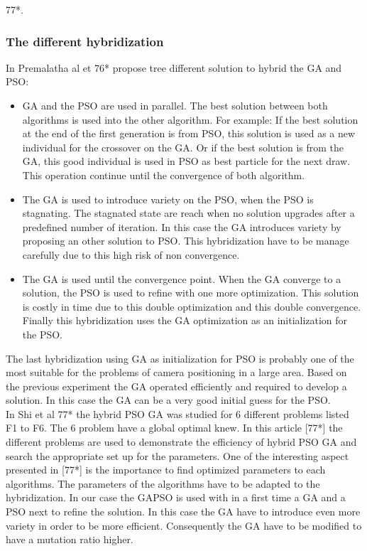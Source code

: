   77*\cite{c13}.
\subsubsection{The different hybridization}

In Premalatha al et 76*  propose tree different solution to hybrid the GA and PSO: 
\begin{itemize}
\item  GA and the PSO are used in parallel. The best solution between both algorithms is used into the other algorithm. 
For example: If the best solution at the end of the first generation is from PSO, this solution is used as a new individual for the crossover on the GA. Or if the best solution is from the GA, this good individual is used in PSO as best particle for the next draw. This operation continue until the convergence of both algorithm.   
 
\item The GA is used to introduce variety on the PSO, when the PSO is stagnating. The stagnated state are reach when no solution upgrades after a predefined number of iteration. In this case the GA introduces variety by proposing an other solution to PSO. This hybridization have to be manage carefully due to this high risk of non convergence. 

\item The GA is used until the convergence point. When the GA converge to a solution, the PSO is used to refine  with one more optimization. This solution is costly in time due to this double optimization and this double convergence. Finally this hybridization uses the GA optimization as an initialization for the PSO.\\
\end{itemize}

The last hybridization using GA as initialization for PSO is probably one of the most suitable for the problems of camera positioning in a large area. 
Based on the previous experiment the  GA operated efficiently  and required to develop a  %
solution.  %
In this case the GA can be a very good initial guess for the PSO. \\

In Shi et al 77*\cite{c13} the hybrid PSO GA was studied for 6 different problems listed F1 to F6. The 6 problem have a global optimal knew.  In this article [77*] the different problems are used to demonstrate the efficiency of hybrid PSO GA and search the appropriate set up for the parameters. One of the interesting aspect presented in [77*] is the importance to find optimized parameters to each algorithms. 
The parameters of the algorithms have to be adapted to the hybridization.
 In our case the GAPSO is used with in a first time a GA and a PSO next to refine the solution. In this case the GA have to introduce even more variety in order to be more efficient. Consequently the GA have to be modified to have a mutation ratio higher.   



